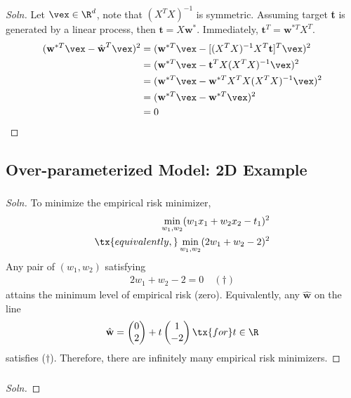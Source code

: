 \documentclass{article}
\begin{document}
	\subsubsection{}
	\begin{proof}[Soln]
		Let $\vex \in \R^d$, note that $(X^T X)^{-1}$ is symmetric. Assuming target \textbf{t} is generated by a linear process, then $\textbf{t} = X \textbf{w}^*$. Immediately, $\textbf{t}^T = \textbf{w}^{*T} X^T$.
		\begin{align}
			(\textbf{w}^{*T} \vex  -  \hat{\textbf{w}}^{T} \vex)^2 
			&= (\textbf{w}^{*T} \vex - [(X^T X)^{-1} X^T \textbf{t}]^T \vex)^2 \\
			&= (\textbf{w}^{*T} \vex - \textbf{t}^T X (X^T X)^{-1} \vex)^2 \\
			&= (\textbf{w}^{*T} \vex - \textbf{w}^{*T} X^T X (X^T X)^{-1} \vex)^2 \\
			&= (\textbf{w}^{*T} \vex - \textbf{w}^{*T} \vex)^2 \\
			&= 0
		\end{align}
	\end{proof}
	
	\subsection{Over-parameterized Model: 2D Example}
	\subsubsection{}
	\begin{proof}[Soln]
		To minimize the empirical risk minimizer, 
		\begin{align}
			\min_{w_1, w_2} (w_1 x_1 + w_2 x_2 - t_1)^2 \\
			\tx{equivalently, } \min_{w_1, w_2} (2 w_1 + w_2 - 2)^2
		\end{align}
		Any pair of $(w_1, w_2)$ satisfying
		\begin{align}
			2 w_1 + w_2 - 2 = 0\quad (\dagger)
		\end{align}
		attains the minimum level of empirical risk (zero). Equivalently, any $\hat{\textbf{w}}$ on the line
		\begin{align}
			\hat{\textbf{w}} = \begin{pmatrix}
				0 \\ 2
			\end{pmatrix} + t \begin{pmatrix}
				1 \\ -2
			\end{pmatrix} \tx{ for } t \in \R
		\end{align}
		satisfies ($\dagger$). Therefore, there are infinitely many empirical risk minimizers.
	\end{proof}
	\subsubsection{}
	\begin{proof}[Soln]
		
	\end{proof}
\end{document}
